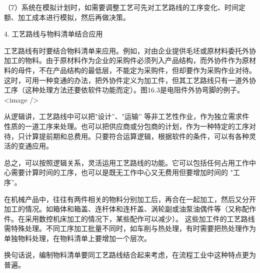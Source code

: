     （7）系统在模拟计划时，如需要调整工艺可先对工艺路线的工序变化、时间定额、加工成本进行模拟，然后再做决策。

4. 工艺路线与物料清单结合应用

    工艺路线有时要结合物料清单来应用。例如，对由企业提供毛坯或原材料委托外协加工的物料。由于原材料作为企业的采购件必须列入产品结构，而外协件作为原材料的母件，不在产品结构的最低层，不能定为采购件，但却要作为采购作业对待。 这时，可用一种变通的办法，把外协件定义为加工件，但其工艺路线只有一道外协工序（这种处理方法还要依软件功能而定）。图16.3是电阻件外协弯脚的例子。
    <image />

    从逻辑讲，工艺路线中可以把"设计”、"运输” 等非工艺性作业，作为独立需求件性质的一道工序来处理。也可以把供应商或分包商的计划，作为一种特定的工序对待，只计算提前期和总费用。只要符合运算逻辑，根据软件的条件，可以有各种灵活的变通应用。

    总之，可以按照逻辑关系，灵活运用工艺路线的功能。它可以包括任何占用工作中心需要计算时间的工序，也可以是既无工作中心又无费用但要增加时间的 "工序”。

    在机械产品中，往往有两件相关的物料分别加工后，再合在一起加工，然后又分开加工的情况。如箱体和箱盖、连杆体和连杆盖、涡轮副或油泵油偶件等（又称配作件。在采用数控机床加工的情况下，某些配作可以减少）。 这些加工件的工艺路线需特殊处理。不同工序加工批量不同时，如车削与热处理，有时需要把热处理作为单独物料处理，在物料清单上要增加一个层次。

    换句话说，编制物料清单要同工艺路线结合起来考虑，在流程工业中这种特点更为普遍。
